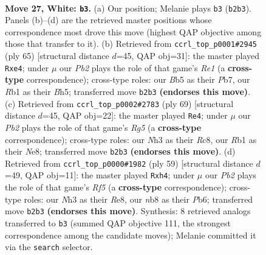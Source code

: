 \documentclass[11pt]{article}
\begin{document}
\clearpage

\begin{figure}[p]\centering
\begin{subfigure}{0.46\textwidth}\centering
\resizebox{\linewidth}{!}{%
\newchessgame
\chessboard[
  setfen={rn5r/8/7k/1B1p1p1p/8/p3K1PN/PP6/1R6 w - - 0 27},
  showmover=false,
  pgfstyle=straightmove, color=movearrow, markmove={b2-b3}
]}
\caption{}
\end{subfigure}\hfill
\begin{subfigure}{0.46\textwidth}\centering
\resizebox{\linewidth}{!}{%
\newchessgame
\chessboard[
  setfen={4r1k1/1p5p/5p2/2P3pb/1P1NR3/6P1/6P1/R5K1 b - - 0 33},
  showmover=false,
  pgfstyle=straightmove, color=movearrow, markmove={e8-e4}
]}
\caption{}
\end{subfigure}
\\[4pt]
\begin{subfigure}{0.46\textwidth}\centering
\resizebox{\linewidth}{!}{%
\newchessgame
\chessboard[
  setfen={2r1n1k1/1p6/p3P1p1/6P1/P5r1/1P1R1N2/8/1K1R4 b - - 2 35},
  showmover=false,
  pgfstyle=straightmove, color=movearrow, markmove={g4-e4}
]}
\caption{}
\end{subfigure}\hfill
\begin{subfigure}{0.46\textwidth}\centering
\resizebox{\linewidth}{!}{%
\newchessgame
\chessboard[
  setfen={4r1k1/6p1/1p4P1/p2R3p/5r1P/P7/1P6/1K4R1 b - - 0 30},
  showmover=false,
  pgfstyle=straightmove, color=movearrow, markmove={f4-h4}
]}
\caption{}
\end{subfigure}
\caption{\textbf{Move 27, White: \texttt{b3}.} (a) Our position; Melanie plays \texttt{b3} (\texttt{b2b3}). Panels (b)--(d) are the retrieved master positions whose correspondence most drove this move (highest QAP objective among those that transfer to it). (b) Retrieved from \texttt{ccrl\_top\_p0001\#2945} (ply 65) [structural distance $d$=45, QAP obj=31]: the master played \texttt{Rxe4}; under $\mu$ our \emph{Pb2} plays the role of that game's \emph{Re1} (a \textbf{cross-type} correspondence); cross-type roles: our \emph{B}b5 as their \emph{P}b7, our \emph{R}b1 as their \emph{B}h5; transferred move \texttt{b2b3} \textbf{(endorses this move)}. (c) Retrieved from \texttt{ccrl\_top\_p0002\#2783} (ply 69) [structural distance $d$=45, QAP obj=22]: the master played \texttt{Re4}; under $\mu$ our \emph{Pb2} plays the role of that game's \emph{Rg5} (a \textbf{cross-type} correspondence); cross-type roles: our \emph{N}h3 as their \emph{R}c8, our \emph{R}b1 as their \emph{N}e8; transferred move \texttt{b2b3} \textbf{(endorses this move)}. (d) Retrieved from \texttt{ccrl\_top\_p0000\#1982} (ply 59) [structural distance $d$=49, QAP obj=11]: the master played \texttt{Rxh4}; under $\mu$ our \emph{Pb2} plays the role of that game's \emph{Rf5} (a \textbf{cross-type} correspondence); cross-type roles: our \emph{N}h3 as their \emph{R}e8, our \emph{n}b8 as their \emph{P}b6; transferred move \texttt{b2b3} \textbf{(endorses this move)}. Synthesis: 8 retrieved analogs transferred to \texttt{b3} (summed QAP objective 111, the strongest correspondence among the candidate moves); Melanie committed it via the \texttt{search} selector.}
\label{fig:thought-m52}
\end{figure}
\end{document}
